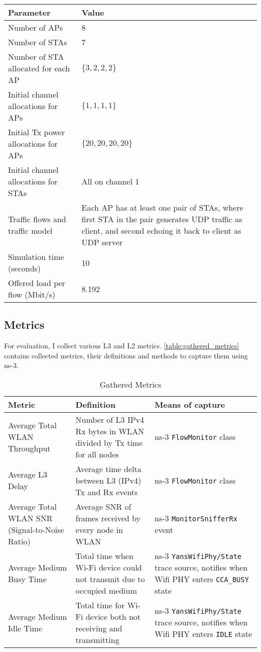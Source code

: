 \begin{longtable}{|p{6cm}|p{7cm}|}
\textbf{Parameter} & \textbf{Value} \\ \hline
Number of APs & 8 \\ \hline
Number of STAs & 7 \\ \hline
Number of STA allocated for each AP & $\{3, 2, 2, 2\}$ \\ \hline
Initial channel allocations for APs  & $\{1, 1, 1, 1\}$ \\ \hline
Initial Tx power allocations for APs  & $\{20, 20, 20, 20\}$ \\ \hline
Initial channel allocations for STAs &  All on channel 1 \\ \hline
Traffic flows and traffic model  & Each AP has at least one pair of STAs, where first STA in the pair generates UDP traffic as client, and second echoing it back to client as UDP server \\ \hline
Simulation time (seconds) & 10 \\ \hline
Offered load per flow (Mbit/s) & 8.192 \\ \hline
\end{longtable}

\subsection{Metrics}
For evaluation, I collect various L3 and L2 metrics. \autoref{table:gathered_metrics} contains collected metrics, their definitions and methods to capture them using ns-3.

\begin{longtable}{|p{5cm}|p{5cm}|p{5cm}|}
\caption{Gathered Metrics}
\label{table:gathered_metrics} \\
\hline
\textbf{Metric} & \textbf{Definition} & \textbf{Means of capture}\\ \hline
Average Total WLAN Throughput & Number of L3 IPv4 Rx bytes in WLAN divided by Tx time for all nodes & ns-3 \texttt{FlowMonitor} class \\
\hline
Average L3 Delay & Average time delta between L3 (IPv4) Tx and Rx events & ns-3 \texttt{FlowMonitor} class \\
\hline
Average Total WLAN SNR (Signal-to-Noise Ratio) & Average SNR of frames received by every node in WLAN & ns-3 \texttt{MonitorSnifferRx} event \\
\hline
Average Medium Busy Time & Total time when Wi-Fi device could not transmit due to occupied medium & ns-3 \texttt{YansWifiPhy/State} trace source, notifies when Wifi PHY enters \texttt{CCA\_BUSY} state \\
\hline
Average Medium Idle Time & Total time for Wi-Fi device both not receiving and transmitting & ns-3 \texttt{YansWifiPhy/State} trace source, notifies when Wifi PHY enters \texttt{IDLE} state\\
\hline
\end{longtable}


